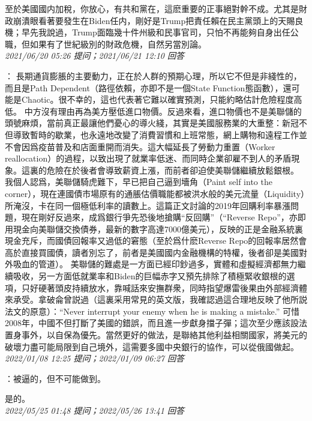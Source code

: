 \documentclass[twocolumn]{ctexart}
\begin{document}
至於美國國内加稅，你放心，有共和黨在，這麽重要的正事絕對幹不成。尤其是財政崩潰眼看著要發生在Biden任内，剛好是Trump把責任賴在民主黨頭上的天賜良機；早先我說過，Trump面臨幾十件州級和民事官司，只怕不再能夠自身出任公職，但如果有了世紀級別的財政危機，自然另當別論。
\\

\textit{\hfill\noindent\small 2021/06/20 05:26 提问；2021/06/21 12:10 回答}

：
長期通貨膨脹的主要動力，正在於人群的預期心理，所以它不但是非綫性的，而且是Path Dependent（路徑依賴，亦即不是一個State Function態函數），還可能是Chaotic。很不幸的，這也代表著它難以確實預測，只能約略估計危險程度高低。
中方沒有理由再為美方壓低進口物價。反過來看，進口物價也不是美聯儲的頭號麻煩，當前真正最讓他們憂心的導火綫，其實是美國服務業的大重整：新冠不但導致暫時的歇業，也永遠地改變了消費習慣和上班常態，網上購物和遠程工作並不會因爲疫苗普及和店面重開而消失。這大幅延長了勞動力重置（Worker reallocation）的過程，以致出現了就業率低迷、而同時企業卻雇不到人的矛盾現象。這裏的危險在於後者會導致薪資上漲，而前者卻迫使美聯儲繼續放鬆銀根。
我個人認爲，美聯儲騎虎難下，早已把自己逼到墻角（Paint self into the corner），現在連國債市場原有的通脹估價職能都被洪水般的美元流量（Liquidity）所淹沒，卡在同一個極低利率的讀數上。這篇正文討論的2019年回購利率暴漲問題，現在剛好反過來，成爲銀行爭先恐後地搶購“反回購”（“Reverse Repo”，亦即用現金向美聯儲交換債券，最新的數字高達7000億美元），反映的正是金融系統裏現金充斥，而國債回報率又過低的窘態（至於爲什麽Reverse Repo的回報率居然會高於直接買國債，讀者別忘了，前者是美國國内金融機構的特權，後者卻是美國對外吸血的管道）。
美聯儲的難處是一方面已經印鈔過多，實體和虛擬經濟都無力繼續吸收，另一方面低就業率和Biden的巨幅赤字又預先排除了積極緊收銀根的選項，只好硬著頭皮持續放水，靠喊話來安撫群衆，同時指望爆雷後果由外部經濟體來承受。拿破侖曾説過（這裏采用常見的英文版，我確認過這合理地反映了他所説法文的原意）：“Never interrupt your enemy when he is making a mistake.” 可惜2008年，中國不但打斷了美國的錯誤，而且進一步獻身擋子彈；這次至少應該設法置身事外，以自保為優先。當然更好的做法，是聯絡其他利益相關國家，將美元的破壞力盡可能局限到自己境外，這需要多國中央銀行的協作，可以從俄國做起。
\\

\textit{\hfill\noindent\small 2022/01/08 12:25 提问；2022/01/09 06:27 回答}

：被逼的，但不可能做到。

是的。
\\

\textit{\hfill\noindent\small 2022/05/25 01:48 提问；2022/05/26 13:41 回答}
\end{document}
